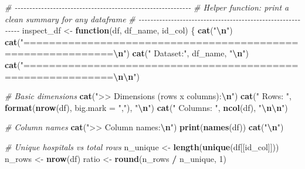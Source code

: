 \documentclass[
]{article}
\newenvironment{Shaded}{\begin{snugshade}}{\end{snugshade}}
\newcommand{\AttributeTok}[1]{\textcolor[rgb]{0.13,0.29,0.53}{#1}}
\newcommand{\CommentTok}[1]{\textcolor[rgb]{0.56,0.35,0.01}{\textit{#1}}}
\newcommand{\ControlFlowTok}[1]{\textcolor[rgb]{0.13,0.29,0.53}{\textbf{#1}}}
\newcommand{\DecValTok}[1]{\textcolor[rgb]{0.00,0.00,0.81}{#1}}
\newcommand{\FunctionTok}[1]{\textcolor[rgb]{0.13,0.29,0.53}{\textbf{#1}}}
\newcommand{\NormalTok}[1]{#1}
\newcommand{\OtherTok}[1]{\textcolor[rgb]{0.56,0.35,0.01}{#1}}
\newcommand{\SpecialCharTok}[1]{\textcolor[rgb]{0.81,0.36,0.00}{\textbf{#1}}}
\newcommand{\StringTok}[1]{\textcolor[rgb]{0.31,0.60,0.02}{#1}}
\begin{document}
\begin{Shaded}
\begin{Highlighting}[]
\CommentTok{\# {-}{-}{-}{-}{-}{-}{-}{-}{-}{-}{-}{-}{-}{-}{-}{-}{-}{-}{-}{-}{-}{-}{-}{-}{-}{-}{-}{-}{-}{-}{-}{-}{-}{-}{-}{-}{-}{-}{-}{-}{-}{-}{-}{-}{-}{-}{-}{-}{-}{-}{-}{-}{-}{-}{-}{-}{-}{-}{-}{-}}
\CommentTok{\# Helper function: print a clean summary for any dataframe}
\CommentTok{\# {-}{-}{-}{-}{-}{-}{-}{-}{-}{-}{-}{-}{-}{-}{-}{-}{-}{-}{-}{-}{-}{-}{-}{-}{-}{-}{-}{-}{-}{-}{-}{-}{-}{-}{-}{-}{-}{-}{-}{-}{-}{-}{-}{-}{-}{-}{-}{-}{-}{-}{-}{-}{-}{-}{-}{-}{-}{-}{-}{-}}
\NormalTok{inspect\_df }\OtherTok{\textless{}{-}} \ControlFlowTok{function}\NormalTok{(df, df\_name, id\_col) \{}
    \FunctionTok{cat}\NormalTok{(}\StringTok{"}\SpecialCharTok{\textbackslash{}n}\StringTok{"}\NormalTok{)}
    \FunctionTok{cat}\NormalTok{(}\StringTok{"============================================================}\SpecialCharTok{\textbackslash{}n}\StringTok{"}\NormalTok{)}
    \FunctionTok{cat}\NormalTok{(}\StringTok{"  Dataset:"}\NormalTok{, df\_name, }\StringTok{"}\SpecialCharTok{\textbackslash{}n}\StringTok{"}\NormalTok{)}
    \FunctionTok{cat}\NormalTok{(}\StringTok{"============================================================}\SpecialCharTok{\textbackslash{}n\textbackslash{}n}\StringTok{"}\NormalTok{)}
    
    \CommentTok{\# Basic dimensions}
    \FunctionTok{cat}\NormalTok{(}\StringTok{"\textgreater{}\textgreater{} Dimensions (rows x columns):}\SpecialCharTok{\textbackslash{}n}\StringTok{"}\NormalTok{)}
    \FunctionTok{cat}\NormalTok{(}\StringTok{"   Rows:    "}\NormalTok{, }\FunctionTok{format}\NormalTok{(}\FunctionTok{nrow}\NormalTok{(df), }\AttributeTok{big.mark =} \StringTok{","}\NormalTok{), }\StringTok{"}\SpecialCharTok{\textbackslash{}n}\StringTok{"}\NormalTok{)}
    \FunctionTok{cat}\NormalTok{(}\StringTok{"   Columns: "}\NormalTok{, }\FunctionTok{ncol}\NormalTok{(df), }\StringTok{"}\SpecialCharTok{\textbackslash{}n\textbackslash{}n}\StringTok{"}\NormalTok{)}
    
    \CommentTok{\# Column names}
    \FunctionTok{cat}\NormalTok{(}\StringTok{"\textgreater{}\textgreater{} Column names:}\SpecialCharTok{\textbackslash{}n}\StringTok{"}\NormalTok{)}
    \FunctionTok{print}\NormalTok{(}\FunctionTok{names}\NormalTok{(df))}
    \FunctionTok{cat}\NormalTok{(}\StringTok{"}\SpecialCharTok{\textbackslash{}n}\StringTok{"}\NormalTok{)}
    
    \CommentTok{\# Unique hospitals vs total rows}
\NormalTok{    n\_unique }\OtherTok{\textless{}{-}} \FunctionTok{length}\NormalTok{(}\FunctionTok{unique}\NormalTok{(df[[id\_col]]))}
\NormalTok{    n\_rows   }\OtherTok{\textless{}{-}} \FunctionTok{nrow}\NormalTok{(df)}
\NormalTok{    ratio    }\OtherTok{\textless{}{-}} \FunctionTok{round}\NormalTok{(n\_rows }\SpecialCharTok{/}\NormalTok{ n\_unique, }\DecValTok{1}\NormalTok{)}
    

\end{Highlighting}
\end{Shaded}
\end{document}
